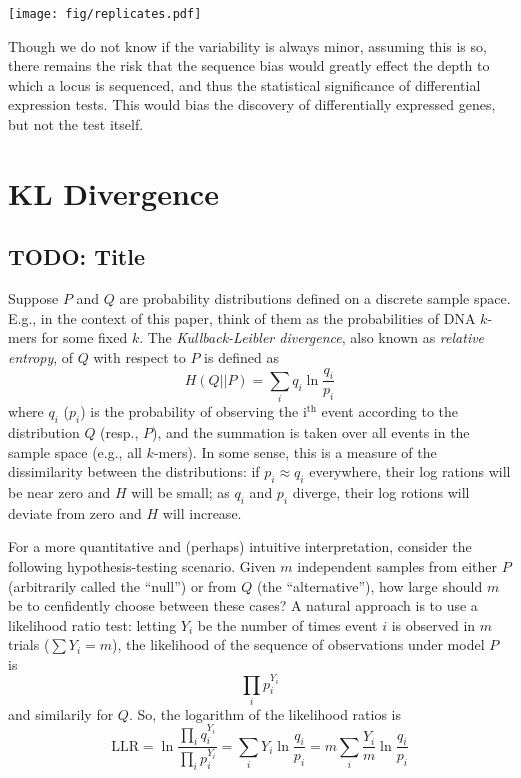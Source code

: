\documentclass[letterpaper]{article}
\begin{document}
\begin{center}
\texttt{[image: fig/replicates.pdf]}
\end{center}

Though we do not know if the variability is always minor, assuming this is so,
there remains the risk that the sequence bias would greatly effect the depth to
which a locus is sequenced, and thus the statistical significance of
differential expression tests. This would bias the discovery of differentially
expressed genes, but not the test itself.


\section{KL Divergence}

\subsection{TODO: Title}

Suppose $P$ and $Q$ are probability distributions defined on a discrete sample
space. E.g., in the context of this paper, think of them as the probabilities of
DNA $k$-mers for some fixed $k$. The \emph{Kullback-Leibler divergence}, also
known as \emph{relative entropy}, of $Q$ with respect to $P$ is defined as
$$H(Q||P) = \sum_{i} q_i \ln \frac{q_{i}}{p_{i}}$$
where $q_{i}$ ($p_{i}$) is the probability of observing the i$^{\text{th}}$
event according to the distribution $Q$ (resp., $P$), and the summation is taken
over all events in the sample space (e.g., all $k$-mers). In some sense, this is
a measure of the dissimilarity between the distributions: if $p_{i} \approx
q_{i}$ everywhere, their log rations will be near zero and $H$ will be small; as
$q_{i}$ and $p_{i}$ diverge, their log rotions will deviate from zero and $H$
will increase.

For a more quantitative and (perhaps) intuitive interpretation, consider the
following hypothesis-testing scenario. Given $m$ independent samples from either
$P$ (arbitrarily called the ``null'') or from $Q$ (the ``alternative''), how
large should $m$ be to cenfidently choose between these cases? A natural
approach is to use a likelihood ratio test: letting $Y_i$ be the number of times
event $i$ is observed in $m$ trials ($\sum Y_i = m$), the likelihood of the
sequence of observations under model $P$ is $$\prod_{i} p_{i}^{Y_{i}}$$
and similarily for $Q$. So, the logarithm of the likelihood ratios is
$$
\text{LLR} =
\ln \frac{\prod_{i} q_{i} ^ {Y_{i}}}{\prod_{i} p_{i} ^ {Y_{i}}}
= \sum_{i} Y_{i} \ln \frac{q_{i}}{p_{i}}
= m \sum_{i} \frac{Y_{i}}{m} \ln \frac{q_{i}}{p_{i}} $$
\end{document}
